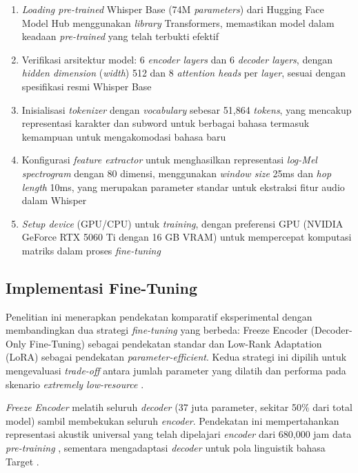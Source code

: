 \begin{enumerate}[noitemsep]
    \item \textit{Loading pre-trained} Whisper Base (74M \textit{parameters}) dari Hugging Face Model Hub menggunakan \textit{library} Transformers, memastikan model dalam keadaan \textit{pre-trained} yang telah terbukti efektif
    \item Verifikasi arsitektur model: 6 \textit{encoder layers} dan 6 \textit{decoder layers}, dengan \textit{hidden dimension} (\textit{width}) 512 dan 8 \textit{attention heads} per \textit{layer}, sesuai dengan spesifikasi resmi Whisper Base
    \item Inisialisasi \textit{tokenizer} dengan \textit{vocabulary} sebesar 51,864 \textit{tokens}, yang mencakup representasi karakter dan subword untuk berbagai bahasa termasuk kemampuan untuk mengakomodasi bahasa baru
    \item Konfigurasi \textit{feature extractor} untuk menghasilkan representasi \textit{log-Mel spectrogram} dengan 80 dimensi, menggunakan \textit{window size} 25ms dan \textit{hop length} 10ms, yang merupakan parameter standar untuk ekstraksi fitur audio dalam Whisper
    \item \textit{Setup device} (GPU/CPU) untuk \textit{training}, dengan preferensi GPU (NVIDIA GeForce RTX 5060 Ti dengan 16 GB VRAM) untuk mempercepat komputasi matriks dalam proses \textit{fine-tuning}
\end{enumerate}

\subsection{Implementasi Fine-Tuning}
\label{III.Langkah6}

Penelitian ini menerapkan pendekatan komparatif eksperimental dengan membandingkan dua strategi \textit{fine-tuning} yang berbeda: Freeze Encoder (Decoder-Only Fine-Tuning) sebagai pendekatan standar dan Low-Rank Adaptation (LoRA) sebagai pendekatan \textit{parameter-efficient}. Kedua strategi ini dipilih untuk mengevaluasi \textit{trade-off} antara jumlah parameter yang dilatih dan performa pada skenario \textit{extremely low-resource} \cite{liu2024exploration}.

\textit{Freeze Encoder} melatih seluruh \textit{decoder} (37 juta parameter, sekitar 50\% dari total model) sambil membekukan seluruh \textit{encoder}. Pendekatan ini mempertahankan representasi akustik universal yang telah dipelajari \textit{encoder} dari 680,000 jam data \textit{pre-training} \cite{radford2023whisper}, sementara mengadaptasi \textit{decoder} untuk pola linguistik bahasa Target \cite{timmel2024finetune}.

